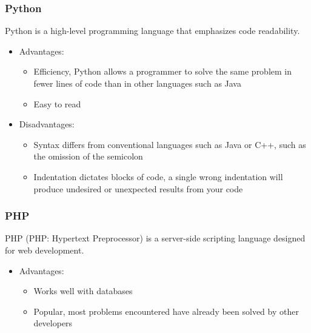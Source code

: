 \documentclass{article}
\begin{document}
			\subsubsection{Python}
				Python is a high-level programming language that emphasizes code readability.
			
				\begin{itemize}
					\item Advantages:
						\begin{itemize}
							\item Efficiency, Python allows a programmer to solve the same problem in fewer lines of code than in other languages such as Java
							\item Easy to read
						\end{itemize}
						
					\item Disadvantages:
						\begin{itemize}
							\item Syntax differs from conventional languages such as Java or C++, such as the omission of the semicolon
							\item Indentation dictates blocks of code, a single wrong indentation will produce undesired or unexpected results from your code
						\end{itemize}
				\end{itemize}
				
			\subsubsection{PHP}
				PHP (PHP: Hypertext Preprocessor) is a server-side scripting language designed for web development.
				
				\begin{itemize}
					\item Advantages:
						\begin{itemize}
							\item Works well with databases
							\item Popular, most problems encountered have already been solved by other developers
						\end{itemize}
						
				\end{itemize}
				
\end{document}

